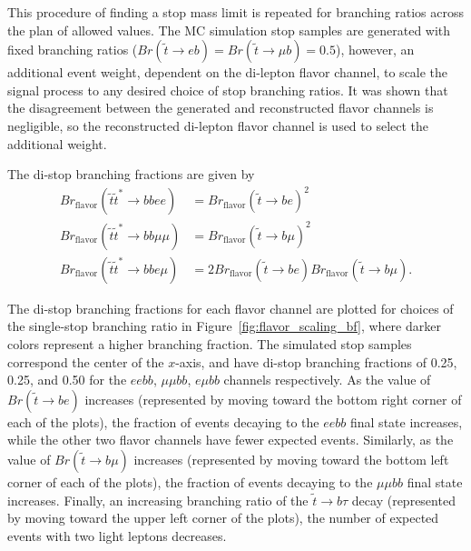 This procedure of finding a stop mass limit is repeated for branching ratios
across the plan of allowed values.
The MC simulation stop samples are generated with fixed branching
ratios ($Br(\tilde{t} \to eb) = Br(\tilde{t} \to \mu b) = 0.5$),
however, an additional event weight, dependent on the di-lepton flavor channel,
to scale the signal process to any desired choice of stop branching ratios.
It was shown that the disagreement between the generated and reconstructed
flavor channels is negligible, so the reconstructed di-lepton flavor channel
is used to select the additional weight.

The di-stop branching fractions are given by 
\begin{equation}
  \label{eqn:branching_fractions}
  \begin{aligned}
    Br_\mathrm{flavor}(\tilde{t}\tilde{t}^{*} \rightarrow bbee)     &=
      Br_\mathrm{flavor}(\tilde{t} \rightarrow be )^{2} \\
    Br_\mathrm{flavor}(\tilde{t}\tilde{t}^{*} \rightarrow bb\mu\mu) &=
      Br_\mathrm{flavor}(\tilde{t} \rightarrow b\mu )^{2} \\
    Br_\mathrm{flavor}(\tilde{t}\tilde{t}^{*} \rightarrow bbe\mu)   &=
      2Br_\mathrm{flavor}(\tilde{t} \rightarrow be )
      Br_\mathrm{flavor}(\tilde{t} \rightarrow b\mu ).
  \end{aligned}
\end{equation}

The di-stop branching fractions for each flavor channel are plotted for choices
of the single-stop branching ratio in Figure~\ref{fig:flavor_scaling_bf}, where
darker colors represent a higher branching fraction.
The simulated stop samples correspond the center of the $x$-axis, and have
di-stop branching fractions of 0.25, 0.25, and 0.50 for the $eebb$,
$\mu\mu bb$, $e\mu bb$ channels respectively.
As the value of $Br(\tilde{t} \to be)$ increases (represented by moving toward
the bottom right corner of each of the plots), the fraction of events decaying
to the $eebb$ final state increases, while the other two flavor channels
have fewer expected events.
Similarly, as the value of $Br(\tilde{t} \to b\mu)$ increases (represented by
moving toward the bottom left corner of each of the plots), the fraction of
events decaying to the $\mu\mu bb$ final state increases.
Finally, an increasing branching ratio of the $\tilde{t} \to b\tau$ decay
(represented by moving toward the upper left corner of the plots), the number
of expected events with two light leptons decreases.


